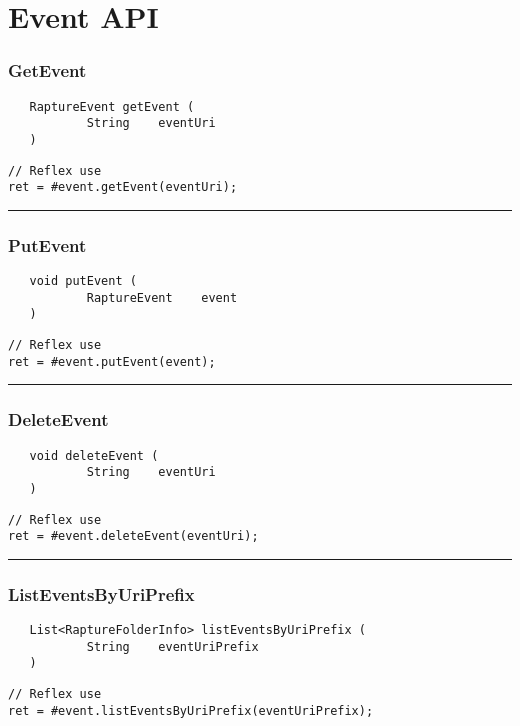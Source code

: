 \section{Event API}

\subsubsection{GetEvent}
\label{Api:GetEvent}
\begin{verbatim}
   RaptureEvent getEvent (
           String    eventUri
   )
\end{verbatim}
\begin{lstlisting}[language=reflex]
// Reflex use
ret = #event.getEvent(eventUri);
\end{lstlisting}



\rule{15cm}{2pt}
\subsubsection{PutEvent}
\label{Api:PutEvent}
\begin{verbatim}
   void putEvent (
           RaptureEvent    event
   )
\end{verbatim}
\begin{lstlisting}[language=reflex]
// Reflex use
ret = #event.putEvent(event);
\end{lstlisting}



\rule{15cm}{2pt}
\subsubsection{DeleteEvent}
\label{Api:DeleteEvent}
\begin{verbatim}
   void deleteEvent (
           String    eventUri
   )
\end{verbatim}
\begin{lstlisting}[language=reflex]
// Reflex use
ret = #event.deleteEvent(eventUri);
\end{lstlisting}



\rule{15cm}{2pt}
\subsubsection{ListEventsByUriPrefix}
\label{Api:ListEventsByUriPrefix}
\begin{verbatim}
   List<RaptureFolderInfo> listEventsByUriPrefix (
           String    eventUriPrefix
   )
\end{verbatim}
\begin{lstlisting}[language=reflex]
// Reflex use
ret = #event.listEventsByUriPrefix(eventUriPrefix);
\end{lstlisting}



